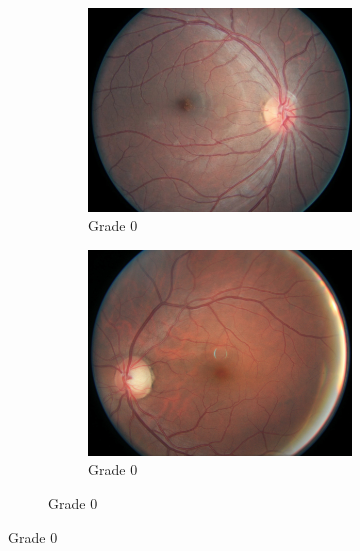\begin{figure}[tb]
    \begin{subfigure}[b]{\textwidth}
        \begin{subfigure}[b]{0.32\textwidth}
            \centering
            \includegraphics[width=\textwidth, height=0.2\textheight]{figures/chapter6/similar/5997_left.jpg}
            \caption{Grade 0}
         \end{subfigure}
         \hfill
         \begin{subfigure}[b]{0.32\textwidth}
            \includegraphics[width=\textwidth, height=0.2\textheight]{figures/chapter6/similar/10861_right.jpeg}
            \caption{Grade 0}
        \end{subfigure}

\end{subfigure}
\end{figure}
